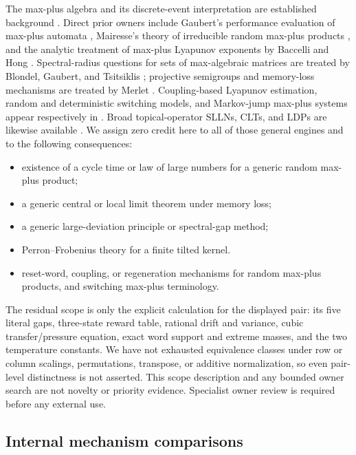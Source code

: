 The max-plus algebra and its discrete-event interpretation are established
background \cite{BaccelliEtAl1992}.  Direct prior owners include Gaubert's
performance evaluation of max-plus automata \cite{Gaubert1995}, Mairesse's
theory of irreducible random max-plus products \cite{Mairesse1997}, and the
analytic treatment of max-plus Lyapunov exponents by Baccelli and Hong
\cite{BaccelliHong2000}.  Spectral-radius questions for sets of max-algebraic
matrices are treated by Blondel, Gaubert, and Tsitsiklis
\cite{BlondelGaubertTsitsiklis2000}; projective semigroups and memory-loss
mechanisms are treated by Merlet
\cite{MerletProjective2010,Merlet2010}.  Coupling-based Lyapunov estimation,
random and deterministic switching models, and Markov-jump max-plus systems
appear respectively in \cite{GoverdeHeidergottMerlet2011,
vanDenBoomDeSchutter2012,KordonisMaragosPapavassilopoulos2018}.  Broad
topical-operator SLLNs, CLTs, and LDPs are likewise available
\cite{Merlet2005,Merlet2007}.  We assign zero credit here to all of those
general engines and to the following consequences:
\begin{itemize}
\item existence of a cycle time or law of large numbers for a generic random
      max-plus product;
\item a generic central or local limit theorem under memory loss;
\item a generic large-deviation principle or spectral-gap method;
\item Perron--Frobenius theory for a finite tilted kernel.
\item reset-word, coupling, or regeneration mechanisms for random max-plus
      products, and switching max-plus terminology.
\end{itemize}
The residual scope is only the explicit calculation for the displayed pair:
its five literal gaps, three-state reward table, rational drift and variance,
cubic transfer/pressure equation, exact word support and extreme masses, and
the two temperature constants.  We have not exhausted equivalence classes
under row or column scalings, permutations, transpose, or additive
normalization, so even pair-level distinctness is not asserted.  This scope
description and any bounded owner search are not novelty or priority
evidence.  Specialist owner review is required before any external use.

\subsection{Internal mechanism comparisons}

